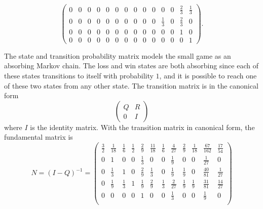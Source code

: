 \documentclass[12pt]{article}
\begin{document}
\begin{example}
\[\begin{pmatrix}
            0   & 0     & 0     & 0     & 0     & 0     & 0     & 0
            & 0 & 0     & 0     & 0     & \frac{2}{3}   & \frac{1}{3}\\
            0   & 0     & 0     & 0     & 0     & 0     & 0     & 0
            & 0 & 0     & \frac{1}{3}   & 0     & \frac{2}{3}   & 0\\
            0   & 0     & 0     & 0     & 0     & 0     & 0     & 0
            & 0 & 0     & 0     & 0     & 1     & 0\\
            0   & 0     & 0     & 0     & 0     & 0     & 0     & 0
            & 0 & 0     & 0     & 0     & 0     & 1
        \end{pmatrix}
        .
    \]

    The state and transition probability matrix models the small game as
    an absorbing Markov chain.  The loss and win states are both
    absorbing since each of these states transitions to itself with
    probability \( 1 \), and it is possible to reach one of these two
    states from any other state.  The transition matrix is in the
    canonical form
    \[
        \begin{pmatrix}
            Q   & R \\
            0   & I
        \end{pmatrix}
    \] where \( I \) is the identity matrix.  With the transition matrix
    in canonical form, the fundamental matrix is
    \[
        N = (I - Q)^{-1} =
        \begin{pmatrix}
            \frac{3}{2} & \frac{1}{18}  & \frac{1}{6}   & \frac{1}{2}
            & \frac{2}{9}       & \frac{11}{18} & \frac{1}{6}   & \frac{4}
            {27}        & \frac{2}{9}   & \frac{1}{18}  & \frac{67}{162}
                & \frac{17}{54}\\
            0   & 1     & 0     & 0     & \frac{1}{3}   & 0     & 0
            & \frac{1}{9}       & 0     & 0     & \frac{1}{27}  & 0\\
            0   & \frac{1}{3}   & 1     & 0     & \frac{2}{9}   & \frac{1}
            {3} & 0     & \frac{1}{9}   & \frac{1}{9}   & 0     & \frac{40}
            {81}        & \frac{1}{27}\\
            0   & \frac{1}{9}   & \frac{1}{3}   & 1     & \frac{1}{9}
            & \frac{2}{9}       & \frac{1}{3}   & \frac{2}{27}  & \frac{1}
            {9} & \frac{1}{9}   & \frac{31}{81} & \frac{14}{27}\\
            0   & 0     & 0     & 0     & 1     & 0     & 0     & \frac{1}
            {3} & 0     & 0     & \frac{1}{9}   & 0\\

\end{pmatrix}\]
\end{example}
\end{document}
